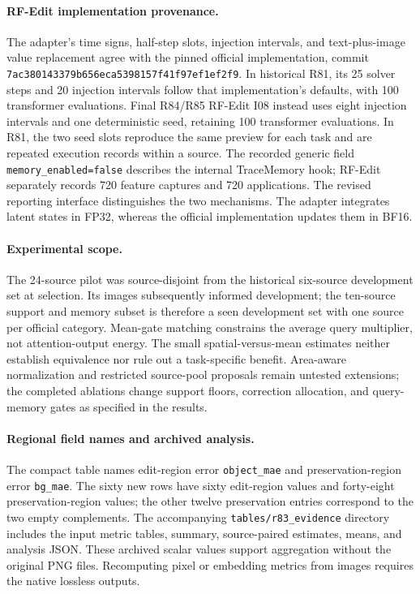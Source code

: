 \paragraph{RF-Edit implementation provenance.}
The adapter's time signs, half-step slots, injection intervals, and text-plus-image value replacement agree with the pinned official implementation, commit \texttt{7ac380143379b656eca5398157f41f97ef1ef2f9}. In historical R81, its 25 solver steps and 20 injection intervals follow that implementation's defaults, with 100 transformer evaluations. Final R84/R85 RF-Edit I08 instead uses eight injection intervals and one deterministic seed, retaining 100 transformer evaluations. In R81, the two seed slots reproduce the same preview for each task and are repeated execution records within a source. The recorded generic field \texttt{memory\_enabled=false} describes the internal TraceMemory hook; RF-Edit separately records 720 feature captures and 720 applications. The revised reporting interface distinguishes the two mechanisms. The adapter integrates latent states in FP32, whereas the official implementation updates them in BF16.

\paragraph{Experimental scope.}
The 24-source pilot was source-disjoint from the historical six-source development set at selection. Its images subsequently informed development; the ten-source support and memory subset is therefore a seen development set with one source per official category. Mean-gate matching constrains the average query multiplier, not attention-output energy. The small spatial-versus-mean estimates neither establish equivalence nor rule out a task-specific benefit. Area-aware normalization and restricted source-pool proposals remain untested extensions; the completed ablations change support floors, correction allocation, and query-memory gates as specified in the results.

\paragraph{Regional field names and archived analysis.}
The compact table names edit-region error \texttt{object\_mae} and preservation-region error \texttt{bg\_mae}. The sixty new rows have sixty edit-region values and forty-eight preservation-region values; the other twelve preservation entries correspond to the two empty complements. The accompanying \texttt{tables/r83\_evidence} directory includes the input metric tables, summary, source-paired estimates, means, and analysis JSON. These archived scalar values support aggregation without the original PNG files. Recomputing pixel or embedding metrics from images requires the native lossless outputs.


